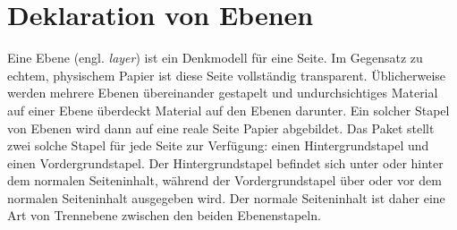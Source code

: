 \section{Deklaration von Ebenen}

Eine Ebene (engl. \emph{layer}) ist ein Denkmodell für eine Seite. Im
Gegensatz zu echtem, physischem Papier ist diese Seite vollständig
transparent. Üblicherweise werden mehrere Ebenen übereinander gestapelt und
undurchsichtiges Material auf einer Ebene überdeckt Material auf den Ebenen
darunter. Ein solcher Stapel von Ebenen wird dann auf eine reale Seite Papier
abgebildet. Das Paket  stellt zwei solche Stapel für jede
Seite zur Verfügung: einen Hintergrundstapel und einen Vordergrundstapel. Der
Hintergrundstapel befindet sich unter oder hinter dem normalen Seiteninhalt,
während der Vordergrundstapel über oder vor dem normalen Seiteninhalt
ausgegeben wird. Der normale Seiteninhalt ist daher eine Art von Trennebene
zwischen den beiden Ebenenstapeln.

